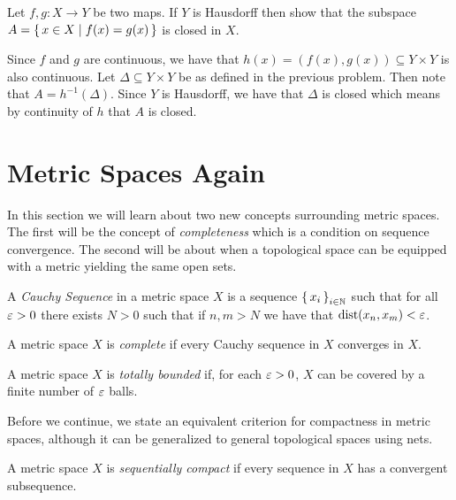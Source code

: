 \documentclass[letterpaper, 11pt, oneside]{book}
\begin{document}
\clearpage

\begin{exercise}
  Let $f, g\colon X \to Y$ be two maps.
  If $Y$ is Hausdorff then show that the subspace $A = \set{x \in X \mid f(x) = g(x)}$ is closed in $X$.
\end{exercise}
\begin{pf}
  Since $f$ and $g$ are continuous, we have that $h(x) = (f(x), g(x)) \subseteq Y \times Y$ is also continuous.
  Let $\Delta \subseteq Y \times Y$ be as defined in the previous problem.
  Then note that $A = h^{-1}(\Delta)$.
  Since $Y$ is Hausdorff, we have that $\Delta$ is closed which means by continuity of $h$ that $A$ is closed.
\end{pf}

\clearpage

\chapter{Metric Spaces Again}

In this section we will learn about two new concepts surrounding metric spaces.
The first will be the concept of \emph{completeness} which is a condition on sequence convergence.
The second will be about when a topological space can be equipped with a metric yielding the same open sets.

\begin{defn}
  A \emph{Cauchy Sequence} in a metric space $X$ is a sequence $\set{x_{i}}_{i \in \mathbb{N}}$ such that for all $\varepsilon > 0$ there exists $N > 0$ such that if $n, m > N$ we have that $\operatorname{dist}(x_{n}, x_{m}) < \varepsilon$.
\end{defn}

\begin{defn}[Completeness]
  A metric space $X$ is \emph{complete} if every Cauchy sequence in $X$ converges in $X$.
\end{defn}

\begin{defn}
  A metric space $X$ is \emph{totally bounded} if, for each $\varepsilon > 0$, $X$ can be covered by a finite number of $\varepsilon$ balls.
\end{defn}

Before we continue, we state an equivalent criterion for compactness in metric spaces, although it can be generalized to general topological spaces using nets.

\begin{defn}
  A metric space $X$ is \emph{sequentially compact} if every sequence in $X$ has a convergent subsequence.
\end{defn}
\end{document}
